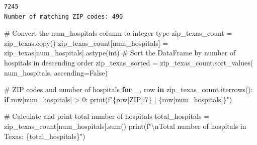 \documentclass[
  letterpaper,
  DIV=11,
  numbers=noendperiod]{scrartcl}
\newenvironment{Shaded}{\begin{snugshade}}{\end{snugshade}}
\newcommand{\BuiltInTok}[1]{\textcolor[rgb]{0.00,0.23,0.31}{#1}}
\newcommand{\CharTok}[1]{\textcolor[rgb]{0.13,0.47,0.30}{#1}}
\newcommand{\CommentTok}[1]{\textcolor[rgb]{0.37,0.37,0.37}{#1}}
\newcommand{\ControlFlowTok}[1]{\textcolor[rgb]{0.00,0.23,0.31}{\textbf{#1}}}
\newcommand{\DecValTok}[1]{\textcolor[rgb]{0.68,0.00,0.00}{#1}}
\newcommand{\KeywordTok}[1]{\textcolor[rgb]{0.00,0.23,0.31}{\textbf{#1}}}
\newcommand{\NormalTok}[1]{\textcolor[rgb]{0.00,0.23,0.31}{#1}}
\newcommand{\OperatorTok}[1]{\textcolor[rgb]{0.37,0.37,0.37}{#1}}
\newcommand{\SpecialCharTok}[1]{\textcolor[rgb]{0.37,0.37,0.37}{#1}}
\newcommand{\SpecialStringTok}[1]{\textcolor[rgb]{0.13,0.47,0.30}{#1}}
\newcommand{\StringTok}[1]{\textcolor[rgb]{0.13,0.47,0.30}{#1}}
\newcommand{\VariableTok}[1]{\textcolor[rgb]{0.07,0.07,0.07}{#1}}
\begin{document}
\begin{verbatim}
7245
Number of matching ZIP codes: 490
\end{verbatim}

\begin{Shaded}
\begin{Highlighting}[]
\CommentTok{\# Convert the \textquotesingle{}num\_hospitals\textquotesingle{} column to integer type}
\NormalTok{zip\_texas\_count }\OperatorTok{=}\NormalTok{ zip\_texas.copy()}
\NormalTok{zip\_texas\_count[}\StringTok{\textquotesingle{}num\_hospitals\textquotesingle{}}\NormalTok{] }\OperatorTok{=}\NormalTok{ zip\_texas[}\StringTok{\textquotesingle{}num\_hospitals\textquotesingle{}}\NormalTok{].astype(}\BuiltInTok{int}\NormalTok{)}
\CommentTok{\# Sort the DataFrame by number of hospitals in descending order}
\NormalTok{zip\_texas\_sorted }\OperatorTok{=}\NormalTok{ zip\_texas\_count.sort\_values(}
    \StringTok{\textquotesingle{}num\_hospitals\textquotesingle{}}\NormalTok{, ascending}\OperatorTok{=}\VariableTok{False}\NormalTok{)}

\CommentTok{\# ZIP codes and number of hospitals}
\ControlFlowTok{for}\NormalTok{ \_, row }\KeywordTok{in}\NormalTok{ zip\_texas\_count.iterrows():}
    \ControlFlowTok{if}\NormalTok{ row[}\StringTok{\textquotesingle{}num\_hospitals\textquotesingle{}}\NormalTok{] }\OperatorTok{\textgreater{}} \DecValTok{0}\NormalTok{:}
        \BuiltInTok{print}\NormalTok{(}\SpecialStringTok{f"}\SpecialCharTok{\{}\NormalTok{row[}\StringTok{\textquotesingle{}ZIP\textquotesingle{}}\NormalTok{]}\SpecialCharTok{:7\}}\SpecialStringTok{ | }\SpecialCharTok{\{}\NormalTok{row[}\StringTok{\textquotesingle{}num\_hospitals\textquotesingle{}}\NormalTok{]}\SpecialCharTok{\}}\SpecialStringTok{"}\NormalTok{)}

\CommentTok{\# Calculate and print total number of hospitals}
\NormalTok{total\_hospitals }\OperatorTok{=}\NormalTok{ zip\_texas\_count[}\StringTok{\textquotesingle{}num\_hospitals\textquotesingle{}}\NormalTok{].}\BuiltInTok{sum}\NormalTok{()}
\BuiltInTok{print}\NormalTok{(}\SpecialStringTok{f"}\CharTok{\textbackslash{}n}\SpecialStringTok{Total number of hospitals in Texas: }\SpecialCharTok{\{}\NormalTok{total\_hospitals}\SpecialCharTok{\}}\SpecialStringTok{"}\NormalTok{)}
\end{Highlighting}
\end{Shaded}
\end{document}
